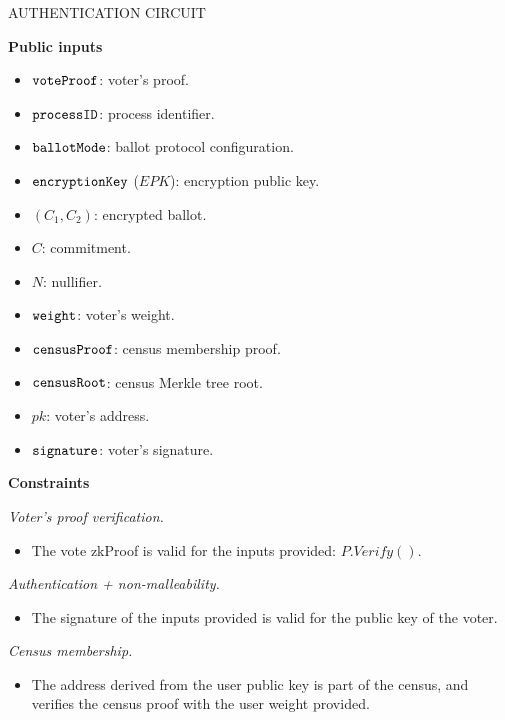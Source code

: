 \begin{mdframed}
	\begin{minipage}[H]{1\textwidth}
		\begin{spacing}{1.25}
			\vspace{0.3cm}
			\begin{center}{AUTHENTICATION CIRCUIT}\end{center}
			\textbf{Public inputs}
			\begin{itemize}
				\item \public $\texttt{voteProof}$: voter's proof.
				\item \public $\texttt{processID}$: process identifier.
				\item \public $\texttt{ballotMode}$: ballot protocol configuration.
				\item \public $\texttt{encryptionKey}$ ($EPK$): encryption public key.
				\item \public $(C_1, C_2)$: encrypted ballot.
				\item \public $C$: commitment.
				\item \public $N$: nullifier.		
				\item \public $\texttt{weight}$: voter's weight.
				\item \public $\texttt{censusProof}$: census membership proof.
				\item \public $\texttt{censusRoot}$: census Merkle tree root.
				\item \public $pk$: voter's address.
				\item \public $\texttt{signature}$: voter's signature.
			\end{itemize}
				\textbf{Constraints} \\ \vspace{-0.4cm}		
			
			\emph{Voter's proof verification.} 
			\begin{itemize}
				\item The vote zkProof is valid for the inputs provided: $P.Verify().$
			\end{itemize}
			\emph{Authentication + non-malleability.}
			\begin{itemize}
				\item The signature of the inputs provided is valid for the public key of the voter.
			\end{itemize} 
			\emph{Census membership.}
			\begin{itemize}								
				\item The address derived from the user public key is part of the census, and verifies the census proof with the user weight provided.
			\end{itemize}
			\vspace{-0.3cm}
		\end{spacing}
	\end{minipage}
\end{mdframed}


